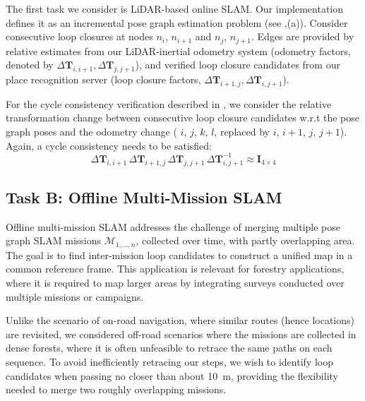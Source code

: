 The first task we consider is LiDAR-based online SLAM. Our implementation defines it as an incremental pose graph estimation problem (see ,(a)). Consider consecutive loop closures at nodes $n_{i}$, $n_{i+1}$ and $n_{j}$, $n_{j+1}$. Edges are provided by relative estimates from our LiDAR-inertial odometry system (odometry factors, denoted by $\Delta\mathbf{T}_{i,i+1}, \Delta\mathbf{T}_{j, j+1}$), and verified loop closure candidates from our place recognition server (loop closure factors, $\Delta\mathbf{T}_{i+1, j}, \Delta\mathbf{T}_{i, j+1}$).

For the cycle consistency verification described in , we consider the relative transformation change between consecutive loop closure candidates w.r.t the pose graph poses and the odometry change (  $i$, $j$, $k$, $l$, replaced by ${i}$, ${i+1}$, ${j}$, ${j+1}$). Again, a cycle consistency needs to be satisfied:
\begin{equation}
  \label{eq:cycle-online}
  \Delta\mathbf{T}_{i,i+1}\, \Delta\mathbf{T}_{i+1, j}\, \Delta\mathbf{T}_{j, j+1}\, \Delta\mathbf{T}_{i, j+1}^{-1} \approx \mathbf{I}_{4\times4}
\end{equation}
\subsection*{Task B: Offline Multi-Mission SLAM}\label{sec:offline}
Offline multi-mission SLAM addresses the challenge of merging multiple pose graph SLAM missions ${\mathcal{M}_{1, \ldots, n}}$, collected over time, with partly overlapping area. 
The goal is to find inter-mission loop candidates to construct a unified map in a common reference frame. This application is relevant for forestry applications, where it is required to map larger areas by integrating surveys conducted over multiple missions or campaigns.

Unlike the scenario of on-road navigation, where similar routes (hence locations) are revisited, we considered off-road scenarios where the missions are collected in dense forests, where it is often unfeasible to retrace the same paths on each sequence. To avoid inefficiently retracing our steps, we wish to identify loop candidates when passing no closer than about \SI{10}{\meter}, providing the flexibility needed to merge two roughly overlapping missions.

